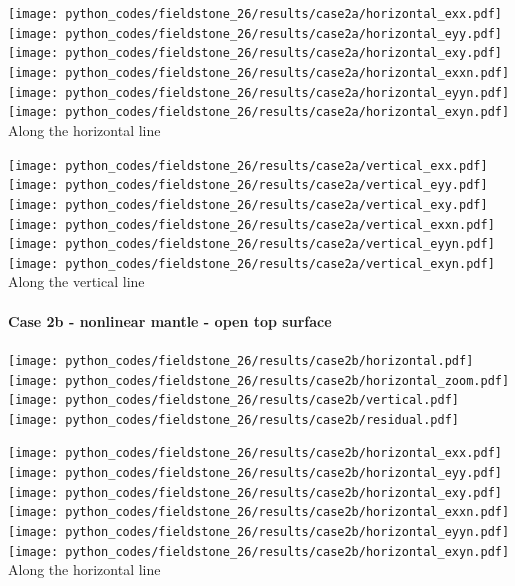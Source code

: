 \begin{center}
\texttt{[image: python\_codes/fieldstone\_26/results/case2a/horizontal\_exx.pdf]}
\texttt{[image: python\_codes/fieldstone\_26/results/case2a/horizontal\_eyy.pdf]}
\texttt{[image: python\_codes/fieldstone\_26/results/case2a/horizontal\_exy.pdf]}\\
\texttt{[image: python\_codes/fieldstone\_26/results/case2a/horizontal\_exxn.pdf]}
\texttt{[image: python\_codes/fieldstone\_26/results/case2a/horizontal\_eyyn.pdf]}
\texttt{[image: python\_codes/fieldstone\_26/results/case2a/horizontal\_exyn.pdf]}\\
{\captionfont Along the horizontal line}
\end{center}

\begin{center}
\texttt{[image: python\_codes/fieldstone\_26/results/case2a/vertical\_exx.pdf]}
\texttt{[image: python\_codes/fieldstone\_26/results/case2a/vertical\_eyy.pdf]}
\texttt{[image: python\_codes/fieldstone\_26/results/case2a/vertical\_exy.pdf]}\\
\texttt{[image: python\_codes/fieldstone\_26/results/case2a/vertical\_exxn.pdf]}
\texttt{[image: python\_codes/fieldstone\_26/results/case2a/vertical\_eyyn.pdf]}
\texttt{[image: python\_codes/fieldstone\_26/results/case2a/vertical\_exyn.pdf]}\\
{\captionfont Along the vertical line}
\end{center}






\newpage
\paragraph{Case 2b - nonlinear mantle - open top surface} 

\begin{center}
\texttt{[image: python\_codes/fieldstone\_26/results/case2b/horizontal.pdf]}
\texttt{[image: python\_codes/fieldstone\_26/results/case2b/horizontal\_zoom.pdf]}\\
\texttt{[image: python\_codes/fieldstone\_26/results/case2b/vertical.pdf]}
\texttt{[image: python\_codes/fieldstone\_26/results/case2b/residual.pdf]}
\end{center}

\begin{center}
\texttt{[image: python\_codes/fieldstone\_26/results/case2b/horizontal\_exx.pdf]}
\texttt{[image: python\_codes/fieldstone\_26/results/case2b/horizontal\_eyy.pdf]}
\texttt{[image: python\_codes/fieldstone\_26/results/case2b/horizontal\_exy.pdf]}\\
\texttt{[image: python\_codes/fieldstone\_26/results/case2b/horizontal\_exxn.pdf]}
\texttt{[image: python\_codes/fieldstone\_26/results/case2b/horizontal\_eyyn.pdf]}
\texttt{[image: python\_codes/fieldstone\_26/results/case2b/horizontal\_exyn.pdf]}\\
{\captionfont Along the horizontal line}
\end{center}

